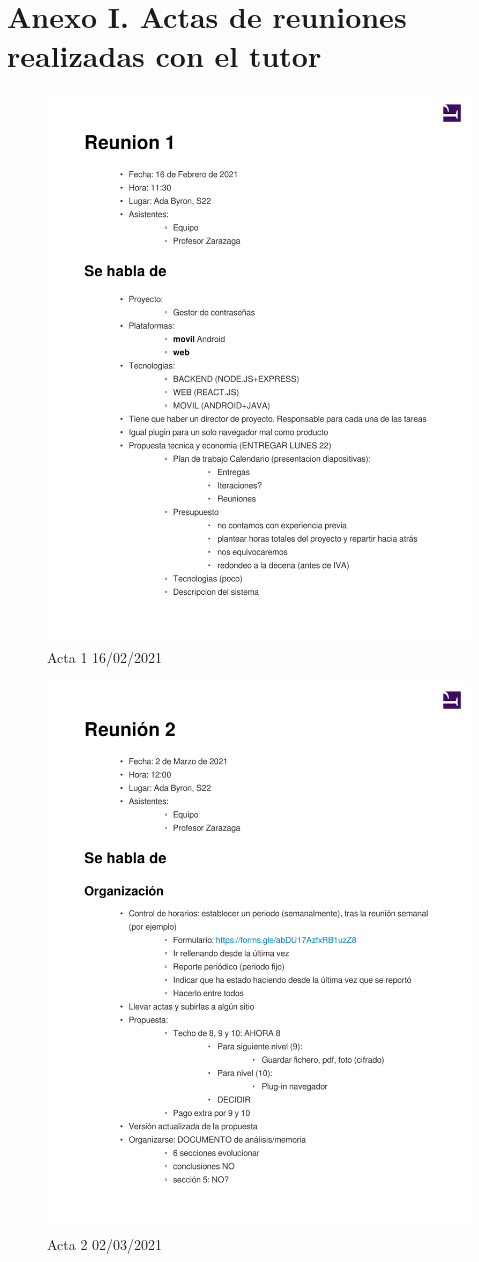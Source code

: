 \documentclass{article}
\begin{document}
\section*{Anexo I. Actas de reuniones realizadas con el tutor}
\begin{figure}[H]
   \includegraphics[width=.8\textwidth]{../../actas_reuniones/2021.02.16_1_Actas.pdf}
   \caption{Acta 1 16/02/2021}
\end{figure}
\begin{figure}[H]
   \includegraphics[width=.8\textwidth]{../../actas_reuniones/2021.03.02_2_Actas.pdf}
   \caption{Acta 2 02/03/2021}
\end{figure}
\end{document}
